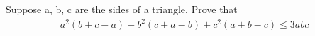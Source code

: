 \item Suppose a, b, c are the sides of a triangle. Prove that
\begin{align*}
a^2(b + c - a) + b^2(c + a - b) + c^2(a + b - c) \leq 3abc
\end{align*}